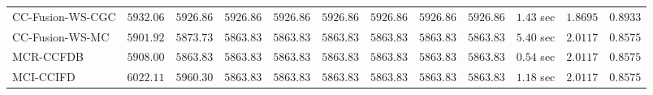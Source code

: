 \begin{table}[H]
\begin{tabular}{lrrrrrrrrrrr}
    CC-Fusion-WS-CGC & $      5932.06$ & $      5926.86$ & $      5926.86$ & $      5926.86$ & $      5926.86$ & $      5926.86$ & $      5926.86$ & $      5926.86$ & $         1.43$ sec    & $       1.8695$  & $       0.8933$ \\ 
     CC-Fusion-WS-MC & $      5901.92$ & $      5873.73$ & $      5863.83$ & $      5863.83$ & $      5863.83$ & $      5863.83$ & $      5863.83$ & $      5863.83$ & $         5.40$ sec    & $       2.0117$  & $       0.8575$ \\ 
\cmidrule{1-1} 
           MCR-CCFDB & $      5908.00$ & $      5863.83$ & $      5863.83$ & $      5863.83$ & $      5863.83$ & $      5863.83$ & $      5863.83$ & $      5863.83$ & $         0.54$ sec    & $       2.0117$  & $       0.8575$ \\ 
\cmidrule{1-1} 
           MCI-CCIFD & $      6022.11$ & $      5960.30$ & $      5863.83$ & $      5863.83$ & $      5863.83$ & $      5863.83$ & $      5863.83$ & $      5863.83$ & $         1.18$ sec    & $       2.0117$  & $       0.8575$ \\ 
\bottomrule
\end{tabular}
\end{table}

